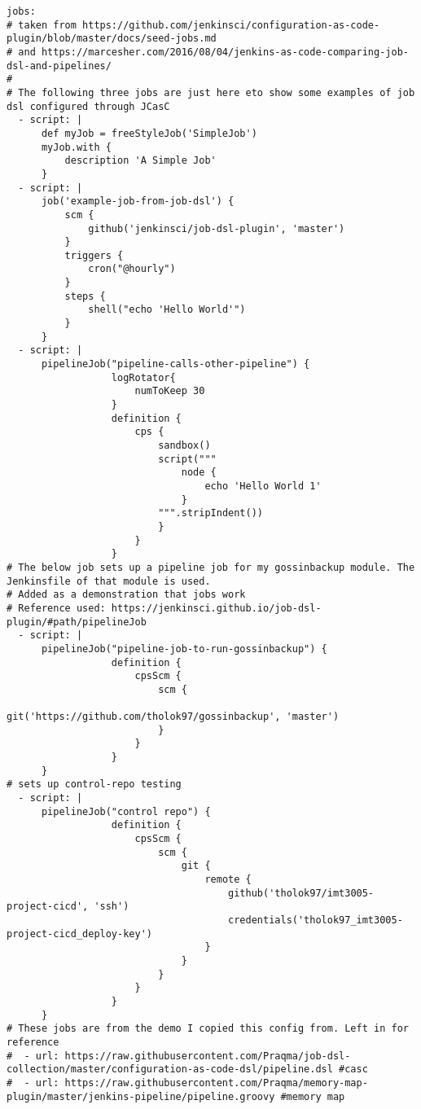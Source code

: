 \begin{verbatim}
jobs:
# taken from https://github.com/jenkinsci/configuration-as-code-plugin/blob/master/docs/seed-jobs.md
# and https://marcesher.com/2016/08/04/jenkins-as-code-comparing-job-dsl-and-pipelines/
#
# The following three jobs are just here eto show some examples of job dsl configured through JCasC
  - script: |
      def myJob = freeStyleJob('SimpleJob')
      myJob.with {
          description 'A Simple Job'
      }
  - script: |
      job('example-job-from-job-dsl') {
          scm {
              github('jenkinsci/job-dsl-plugin', 'master')
          }
          triggers {
              cron("@hourly")
          }
          steps {
              shell("echo 'Hello World'")
          }
      }
  - script: |
      pipelineJob("pipeline-calls-other-pipeline") {
                  logRotator{
                      numToKeep 30
                  }
                  definition {
                      cps {
                          sandbox()
                          script("""
                              node {
                                  echo 'Hello World 1'
                              }
                          """.stripIndent())
                          }
                      }
                  }
# The below job sets up a pipeline job for my gossinbackup module. The Jenkinsfile of that module is used.
# Added as a demonstration that jobs work
# Reference used: https://jenkinsci.github.io/job-dsl-plugin/#path/pipelineJob
  - script: |
      pipelineJob("pipeline-job-to-run-gossinbackup") {
                  definition {
                      cpsScm {
                          scm {
                              git('https://github.com/tholok97/gossinbackup', 'master')
                          }
                      }
                  }
      }
# sets up control-repo testing
  - script: |
      pipelineJob("control repo") {
                  definition {
                      cpsScm {
                          scm {
                              git {
                                  remote {
                                      github('tholok97/imt3005-project-cicd', 'ssh')
                                      credentials('tholok97_imt3005-project-cicd_deploy-key')
                                  }
                              }
                          }
                      }
                  }
      }
# These jobs are from the demo I copied this config from. Left in for reference
#  - url: https://raw.githubusercontent.com/Praqma/job-dsl-collection/master/configuration-as-code-dsl/pipeline.dsl #casc
#  - url: https://raw.githubusercontent.com/Praqma/memory-map-plugin/master/jenkins-pipeline/pipeline.groovy #memory map

\end{verbatim}
